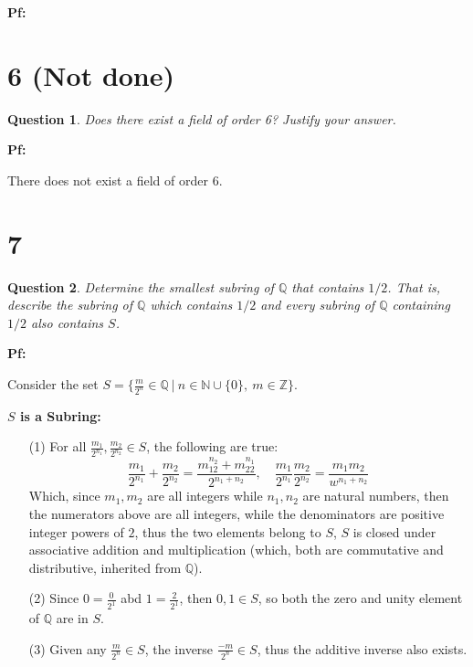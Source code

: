 \documentclass{article}
\newtheorem{question}{Question}
\begin{document}
\textbf{Pf:}

\break


\section*{6 (Not done)}
\begin{myBox}[]{}
    \begin{question}
        Does there exist a field of order 6? Justify your answer.
    \end{question}
\end{myBox}

\textbf{Pf:}

There does not exist a field of order $6$.

\break


\section*{7}
\begin{myBox}[]{}
    \begin{question}
        Determine the smallest subring of $\mathbb{Q}$ that contains $1/2$. That is, describe the subring
        of $\mathbb{Q}$ which contains $1/2$ and every subring of $\mathbb{Q}$ containing $1/2$ also contains $S$.
    \end{question}
\end{myBox}

\textbf{Pf:}

Consider the set $S=\{\frac{m}{2^n}\in\mathbb{Q}\ |\ n\in\mathbb{N}\cup\{0\},\ m\in\mathbb{Z}\}$.

\hfill

\textbf{$S$ is a Subring:}
\begin{itemize}
    \item[(1)] For all $\frac{m_1}{2^{n_1}},\frac{m_2}{2^{n_2}}\in S$, the following are true:
    $$\frac{m_1}{2^{n_1}}+\frac{m_2}{2^{n_2}}=\frac{m_12^{n_2}+m_22^{n_1}}{2^{n_1+n_2}},\quad \frac{m_1}{2^{n_1}}\frac{m_2}{2^{n_2}}=\frac{m_1m_2}{w^{n_1+n_2}}$$
    Which, since $m_1,m_2$ are all integers while $n_1,n_2$ are natural numbers, then the numerators above are all integers, while the denominators are positive integer powers of $2$,
    thus the two elements belong to $S$, $S$ is closed under associative addition and multiplication (which, both are commutative and distributive, inherited from $\mathbb{Q}$).

    \hfill

    \item[(2)] Since $0 = \frac{0}{2^1}$ abd $1=\frac{2}{2^1}$, then $0,1\in S$, so both the zero and unity element of $\mathbb{Q}$ are in $S$.
    
    \hfill

    \item[(3)] Given any $\frac{m}{2^n}\in S$, the inverse $\frac{-m}{2^n}\in S$, thus the additive inverse also exists.
\end{itemize}
\end{document}
